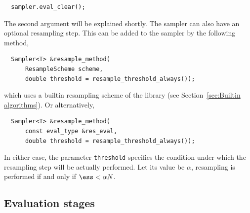 \begin{Verbatim}
  sampler.eval_clear();
\end{Verbatim}
The second argument will be explained shortly. The sampler can also have an
optional resampling step. This can be added to the sampler by the following
method,
\begin{Verbatim}
  Sampler<T> &resample_method(
      ResampleScheme scheme,
      double threshold = resample_threshold_always());
\end{Verbatim}
which uses a builtin resampling scheme of the library (see
Section~\ref{sec:Builtin algorithms}). Or alternatively,
\begin{Verbatim}
  Sampler<T> &resample_method(
      const eval_type &res_eval,
      double threshold = resample_threshold_always());
\end{Verbatim}
In either case, the parameter \verb|threshold| specifies the condition under
which the resampling step will be actually performed. Let its value be
$\alpha$, resampling is performed if and only if $\ess < \alpha N$.

\subsection{Evaluation stages}
\label{sub:Evaluation stages}

